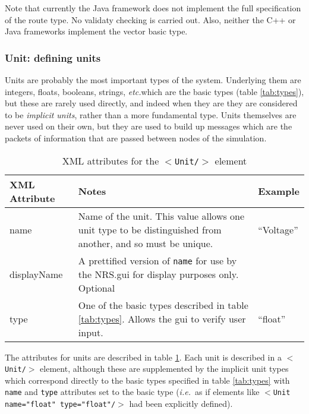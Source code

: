 \documentclass[pdftex,a4paper]{article}
\newcommand{\ie}{{\em i.e.\ }}
\newcommand{\etc}{{\it etc.}}
\newcommand{\XML}[2][]{{\tt \small $<$#2#1/$>$}}
\newcommand{\XMLfont}[1]{{\tt \small #1}}
\begin{document}
Note that currently the Java framework does not implement the full specification
of the route type. No validaty checking is carried out. Also, neither the C++ or
Java frameworks implement the vector basic type.

\subsubsection{Unit: defining units}

\label{sec:units}

Units are probably the most important types of the system. Underlying
them are integers, floats, booleans, strings, \etc which are the basic
types (table \ref{tab:types}), but these are rarely used directly, and
indeed when they are they are considered to be \emph{implicit units},
rather than a more fundamental type. Units themselves are never used
on their own, but they are used to build up messages which are the
packets of information that are passed between nodes of the
simulation.

\begin{table}[!h]
  \begin{center}
    \caption{XML attributes for the \XML{Unit} element}
    \label{tab:units_attrib}
    \begin{tabular}{|l|p{2.5in}|p{0.5in}|}
      \hline

      \textbf{XML Attribute} & \textbf{Notes} & \textbf{Example}\\

      \hline

      name & Name of the unit. This value allows one unit type to be
      distinguished from another, and so must be unique. & ``Voltage''
      \\

      \hline

      displayName & A prettified version of \XMLfont{name} for use by
      the NRS.gui for display purposes only. Optional &  \\

      \hline

      type & One of the basic types described in table \ref{tab:types}. Allows
      the gui to verify user input. & ``float'' \\

      \hline
    \end{tabular}
  \end{center}
\end{table}

The attributes for units are described in table
\ref{tab:units_attrib}. Each unit is described in a \XML{Unit} element,
although these are supplemented by the implicit unit types which
correspond directly to the basic types specified in table
\ref{tab:types} with \XMLfont{name} and \XMLfont{type} attributes set to
the basic type (\ie as if elements like \XML{Unit name="float"
type="float"} had been explicitly defined).
\end{document}
